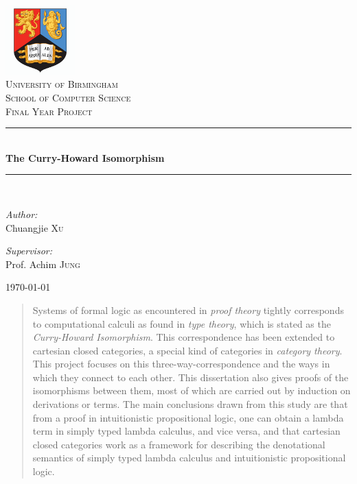 \documentclass[12pt,a4paper,fleqn]{article}
\theoremstyle{definition}
\theoremstyle{plain}
\theoremstyle{plain}
\theoremstyle{definition}
\begin{document}
\begin{titlepage}
\begin{center}
\includegraphics[width=0.2\textwidth]{./images/bham_logo}\\[1cm]
\textsc{\LARGE University of Birmingham}\\[0.5cm]
\textsc{\Large School of Computer Science}\\[1.5cm]
\textsc{\large Final Year Project}\\[0.3cm]
\rule{\linewidth}{0.5mm} \\[0.6cm]
{ \huge \bfseries The Curry-Howard Isomorphism}\\[0.1cm]
\rule{\linewidth}{0.5mm} \\[1.5cm]
\begin{minipage}{0.4\textwidth}
\begin{flushleft} \large
\emph{Author:}\\
Chuangjie \textsc{Xu}
\end{flushleft}
\end{minipage}
\begin{minipage}{0.4\textwidth}
\begin{flushright} \large
\emph{Supervisor:} \\
Prof. Achim \textsc{Jung}
\end{flushright}
\end{minipage}
\vfill
{\large \today}
\end{center}
\end{titlepage}

\begin{abstract}
Systems of formal logic as encountered in \emph{proof theory} tightly corresponds to computational calculi as found in \emph{type theory}, which is stated as the \emph{Curry-Howard Isomorphism}. This correspondence has been extended to cartesian closed categories, a special kind of categories in \emph{category theory}. This project focuses on this three-way-correspondence and the ways in which they connect to each other. This dissertation also gives proofs of the isomorphisms between them, most of which are carried out by induction on derivations or terms. The main conclusions drawn from this study are that from a proof in intuitionistic propositional logic, one can obtain a lambda term in simply typed lambda calculus, and vice versa, and that cartesian closed categories work as a framework for describing the denotational semantics of simply typed lambda calculus and intuitionistic propositional logic.
\end{abstract}
\end{document}
